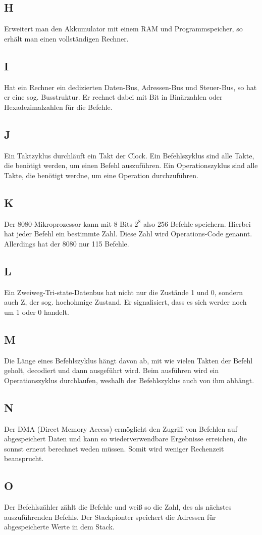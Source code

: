 \documentclass[10pt]{article}
\begin{document}
\begin{multicols}{2}
	\subsection*{H}
	Erweitert man den Akkumulator mit einem RAM und Programmspeicher, so erhält man einen vollständigen Rechner.
	\subsection*{I}
	Hat ein Rechner ein dedizierten Daten-Bus, Adressen-Bus und Steuer-Bus, so hat er eine sog. Busstruktur. Er rechnet dabei mit Bit in Binärzahlen oder Hexadezimalzahlen für die Befehle.
	\subsection*{J}
	Ein Taktzyklus durchläuft ein Takt der Clock. Ein Befehlszyklus sind alle Takte, die benötigt werden, um einen Befehl auszuführen. Ein Operationszyklus sind alle Takte, die benötigt werdne, um eine Operation durchzuführen.
	\subsection*{K}
	Der 8080-Mikroprozessor kann mit 8 Bits $2^8$ also 256 Befehle speichern. Hierbei hat jeder Befehl ein bestimmte Zahl. Diese Zahl wird Operations-Code genannt. Allerdings hat der 8080 nur 115 Befehle.
	\subsection*{L}
	Ein Zweiweg-Tri-state-Datenbus hat nicht nur die Zustände 1 und 0, sondern auch Z, der sog. hochohmige Zustand. Er signalisiert, dass es sich werder noch um 1 oder 0 handelt.
	\subsection*{M}
	Die Länge eines Befehlszyklus hängt davon ab, mit wie vielen Takten der Befehl geholt, decodiert und dann ausgeführt wird. Beim ausführen wird ein Operationszyklus durchlaufen, weshalb der Befehlszyklus auch von ihm abhängt.
	\subsection*{N}
	Der DMA (Direct Memory Access) ermöglicht den Zugriff von Befehlen auf abgespeichert Daten und kann so wiederverwendbare Ergebnisse erreichen, die sonnst erneut berechnet weden müssen. Somit wird weniger Rechenzeit beansprucht.
	\subsection*{O}
	Der Befehlszähler zählt die Befehle und weiß so die Zahl, des als nächstes auszuführenden Befehls. Der Stackpionter speichert die Adressen für abgespeicherte Werte in dem Stack.

\end{multicols}
\end{document}
